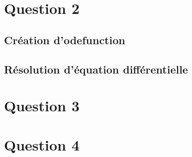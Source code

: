 \documentclass[12pt, a4paper]{report}
\begin{document}
    \chapter{Question 2}
        \section{Création d'odefunction}

        \section{Résolution d'équation différentielle}

    \chapter{Question 3}

    \chapter{Question 4}
\end{document}
